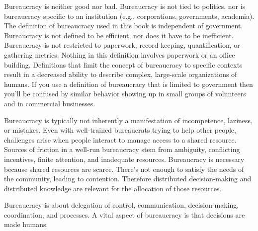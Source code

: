 Bureaucracy is neither good nor bad. Bureaucracy is not tied to politics, nor is bureaucracy specific to an institution (e.g., corporations, governments, academia). The definition of bureaucracy used in this book is independent of government. Bureaucracy is not defined to be efficient, nor does it have to be inefficient. Bureaucracy is not restricted to paperwork, record keeping, quantification, or gathering metrics. Nothing in this definition involves paperwork or an office building. Definitions that limit the concept of bureaucracy to specific contexts result in a decreased ability to describe complex, large-scale organizations of humans. If you use a definition of bureaucracy that is limited to government then you'll be confused by similar behavior showing up in small groups of volunteers and in commercial businesses.

Bureaucracy is typically not inherently a manifestation of incompetence, laziness, or mistakes.
Even with well-trained bureaucrats trying to help other people, challenges arise when people interact to manage access to a shared resource. 
Sources of friction in a well-run bureaucracy stem from  ambiguity, conflicting incentives, finite attention, and inadequate resources. Bureaucracy is necessary because shared resources are scarce. There's not enough to satisfy the needs of the community, leading to contention. Therefore distributed decision-making and distributed knowledge are relevant for the allocation of those resources.


Bureaucracy is about delegation of control, communication, decision-making, coordination, and processes. 
A vital aspect of bureaucracy is that decisions are made humans.

